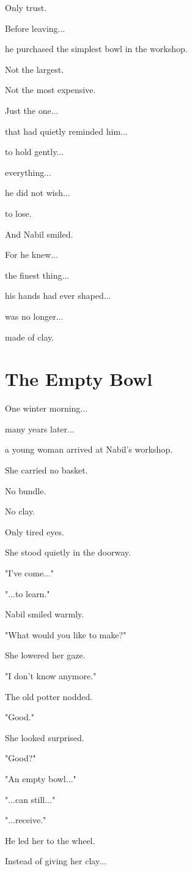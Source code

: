 \documentclass[12pt,openany]{book}
\begin{document}
Only trust.

Before leaving...

he purchased the simplest bowl in the workshop.

Not the largest.

Not the most expensive.

Just the one...

that had quietly reminded him...

to hold gently...

everything...

he did not wish...

to lose.

And Nabil smiled.

For he knew...

the finest thing...

his hands had ever shaped...

was no longer...

made of clay.
\section*{The Empty Bowl}

One winter morning...

many years later...

a young woman arrived at Nabil's workshop.

She carried no basket.

No bundle.

No clay.

Only tired eyes.

She stood quietly in the doorway.

"I've come..."

"...to learn."

Nabil smiled warmly.

"What would you like to make?"

She lowered her gaze.

"I don't know anymore."

The old potter nodded.

"Good."

She looked surprised.

"Good?"

"An empty bowl..."

"...can still..."

"...receive."

He led her to the wheel.

Instead of giving her clay...
\end{document}
